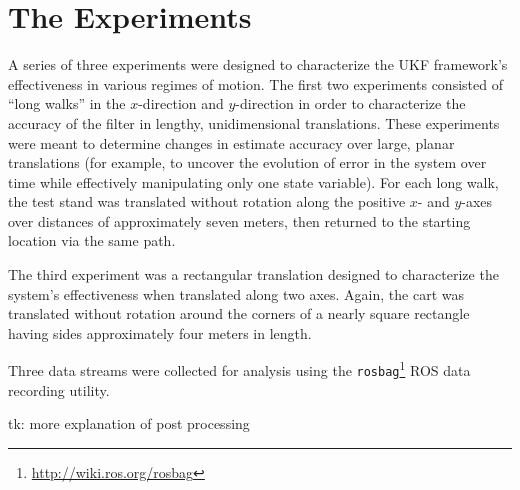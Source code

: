 \section{The Experiments}

A series of three experiments were designed to characterize the UKF framework's effectiveness in various regimes of motion. The first two experiments consisted of ``long walks'' in the $x$-direction and $y$-direction in order to characterize the accuracy of the filter in lengthy, unidimensional translations. These experiments were meant to determine changes in estimate accuracy over large, planar translations (for example, to uncover the evolution of error in the system over time while effectively manipulating only one state variable). For each long walk, the test stand was translated without rotation along the positive $x$- and $y$-axes over distances of approximately seven meters, then returned to the starting location via the same path.

The third experiment was a rectangular translation designed to characterize the system's effectiveness when translated along two axes. Again, the cart was translated without rotation around the corners of a nearly square rectangle having sides approximately four meters in length.

Three data streams were collected for analysis using the \texttt{rosbag}\footnote{\url{http://wiki.ros.org/rosbag}} ROS data recording utility.

tk: more explanation of post processing